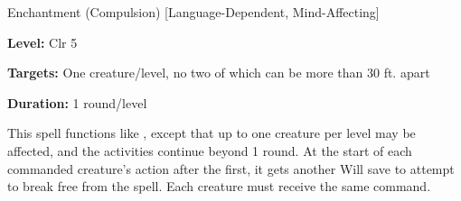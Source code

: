 \label{spell:Greater Command}

Enchantment (Compulsion) [Language-Dependent, Mind-Affecting]

\textbf{Level:} Clr 5

\textbf{Targets:} One creature/level, no two of which can be more than 30 ft. apart

\textbf{Duration:} 1 round/level

This spell functions like , except that up to one creature per 
level may be affected, and the activities continue beyond 1 round. At the start 
of each commanded creature's action after the first, it gets another Will save 
to attempt to break free from the spell. Each creature must receive the same command.

